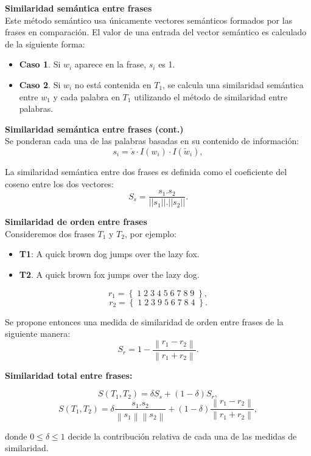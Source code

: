 \begin{frame}[allowframebreaks]
	\framebreak

	\textbf{Similaridad semántica entre frases} \\
	\bigskip
	Este método semántico usa únicamente vectores semánticos formados por las frases en comparación. El valor de una entrada del vector semántico es calculado de la siguiente forma:
	\begin{itemize}[<*>]
		\item \textbf{Caso 1}. Si \(w_i\) aparece en la frase, \(s_i\) es 1.
		\item \textbf{Caso 2}. Si \(w_i\) no está contenida en \(T_1\), se calcula una similaridad semántica entre \(w_1\) y cada palabra en \(T_1\) utilizando el método de similaridad entre palabras.
	\end{itemize}

	\framebreak
	\textbf{Similaridad semántica entre frases (cont.)} \\
	\bigskip
	Se ponderan cada una de las palabras basadas en su contenido de información:
	\[s_i = \check{s} \cdot I(w_i) \cdot I(\widetilde{w}_i),\]

	La similaridad semántica entre dos frases es definida como el coeficiente del coseno entre los dos vectores:
	\[S_s = \frac{s_1. s_2}{||s_1||.||s_2||}.\]

	\framebreak

	\textbf{Similaridad de orden entre frases} \\
	\bigskip
	Consideremos dos frases \(T_1\) y \(T_2\), por ejemplo:
	\begin{itemize}[<*>]
		\item \textbf{T1}: A quick brown dog jumps over the lazy fox.
		\item \textbf{T2}. A quick brown fox jumps over the lazy dog.
	\end{itemize}

	\[r_1 = \left \{\;1\;2\;3\;4\;5\;6\;7\;8\;9\;\right \},\]
	\[r_2 = \left \{\;1\;2\;3\;9\;5\;6\;7\;8\;4\;\right \}.\]

	Se propone entonces una medida de similaridad de orden entre frases de la siguiente manera:
	\[S_r = 1 - \frac{\left \| r_1 - r_2 \right \|}{\left \| r_1 + r_2 \right \|}.\]

	\framebreak

	\textbf{Similaridad total entre frases:} \\
	\bigskip

	\[S(T_1, T_2)=\delta S_s + (1 - \delta)S_r,\]
	\[S(T_1, T_2)=\delta \frac{s_1.s_2}{\left \| s_1 \right \|\left \| s_2 \right \|} + (1 - \delta)\frac{\left \|r_1-r_2 \right \|}{\left \| r_1+r_2 \right \|},\]

	\bigskip
	donde \(0 \leq \delta \leq 1\) decide la contribución relativa de cada una de las medidas de similaridad.
\end{frame}

